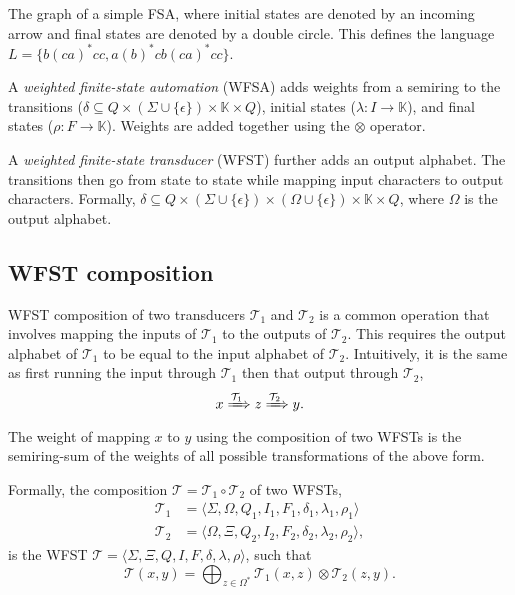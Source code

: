 \begin{marginfigure}
  \centering
  \caption{The graph of a simple FSA, where initial states are denoted by an
  incoming arrow and final states are denoted by a double circle. This defines
  the language $L = \{ b(ca)^*cc, a(b)^*cb(ca)^*cc \}$.}
  \label{fig:example-fsa}
\end{marginfigure}

A \textit{weighted finite-state automation} (WFSA) adds weights from a semiring
to the transitions ($\delta\subseteq Q\times (\Sigma \cup \{ \epsilon \})
\times \mathbb{K} \times Q$), initial states ($\lambda: I\to\mathbb{K}$), and
final states  ($\rho: F\to\mathbb{K}$). Weights are added together using the
$\otimes$ operator.

A \textit{weighted finite-state transducer} (WFST) further adds an output
alphabet. The transitions then go from state to state while mapping input
characters to output characters. Formally, $\delta \subseteq Q \times (\Sigma
\cup \{\epsilon\}) \times (\Omega \cup \{\epsilon\}) \times \mathbb{K} \times
Q$, where $\Omega$ is the output alphabet.

\subsection{WFST composition}

WFST composition of two transducers $\mathcal{T}_1$ and $\mathcal{T}_2$ is a
common operation that involves mapping the inputs of $\mathcal{T}_1$ to the
outputs of $\mathcal{T}_2$. This requires the output alphabet of
$\mathcal{T}_1$ to be equal to the input alphabet of $\mathcal{T}_2$.
Intuitively, it is the same as first running the input through $\mathcal{T}_1$
then that output through $\mathcal{T}_2$, \[
  x \xRightarrow{\mathcal{T}_1} z \xRightarrow{\mathcal{T}_2} y
.\]
The weight of mapping $x$ to $y$ using the composition of two WFSTs is the
semiring-sum of the weights of all possible transformations of the above form.

\begin{definition}
  Formally, the composition $\mathcal{T}=\mathcal{T}_1 \circ \mathcal{T}_2$
  of two WFSTs,
  \begin{align*}
    \mathcal{T}_1 &= \langle \Sigma,\Omega,Q_1,I_1,F_1,\delta_1,\lambda_1,\rho_1 \rangle \\
    \mathcal{T}_2 &= \langle \Omega,\Xi,Q_2,I_2,F_2,\delta_2,\lambda_2,\rho_2 \rangle
  ,\end{align*}
  is the WFST $\mathcal{T}=\langle
  \Sigma,\Xi,Q,I,F,\delta,\lambda,\rho \rangle$, such that \[
    \mathcal{T}(x,y) = \bigoplus_{z\in\Omega^*} \mathcal{T}_1(x,z) \otimes \mathcal{T}_2(z,y)
  .\]
\end{definition}

